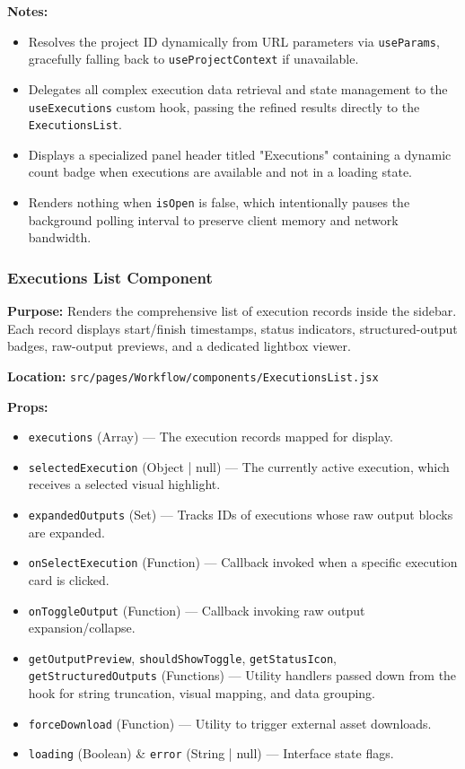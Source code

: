 \vspace{0.2cm}
\noindent\textbf{Notes:}
\begin{itemize}
    \item Resolves the project ID dynamically from URL parameters via \texttt{useParams}, gracefully falling back to \texttt{useProjectContext} if unavailable.
    \item Delegates all complex execution data retrieval and state management to the \texttt{useExecutions} custom hook, passing the refined results directly to the \texttt{ExecutionsList}.
    \item Displays a specialized panel header titled "Executions" containing a dynamic count badge when executions are available and not in a loading state.
    \item Renders nothing when \texttt{isOpen} is false, which intentionally pauses the background polling interval to preserve client memory and network bandwidth.
\end{itemize}

\subsubsection{Executions List Component}

\textbf{Purpose:} Renders the comprehensive list of execution records inside the sidebar. Each record displays start/finish timestamps, status indicators, structured-output badges, raw-output previews, and a dedicated lightbox viewer.

\vspace{0.2cm}
\noindent\textbf{Location:} \texttt{src/pages/Workflow/components/ExecutionsList.jsx}

\vspace{0.2cm}
\noindent\textbf{Props:}
\begin{itemize}
    \item \texttt{executions} (Array) --- The execution records mapped for display.
    \item \texttt{selectedExecution} (Object | null) --- The currently active execution, which receives a selected visual highlight.
    \item \texttt{expandedOutputs} (Set) --- Tracks IDs of executions whose raw output blocks are expanded.
    \item \texttt{onSelectExecution} (Function) --- Callback invoked when a specific execution card is clicked.
    \item \texttt{onToggleOutput} (Function) --- Callback invoking raw output expansion/collapse.
    \item \texttt{getOutputPreview}, \texttt{shouldShowToggle}, \texttt{getStatusIcon}, \texttt{getStructuredOutputs} (Functions) --- Utility handlers passed down from the hook for string truncation, visual mapping, and data grouping.
    \item \texttt{forceDownload} (Function) --- Utility to trigger external asset downloads.
    \item \texttt{loading} (Boolean) \& \texttt{error} (String | null) --- Interface state flags.
\end{itemize}

